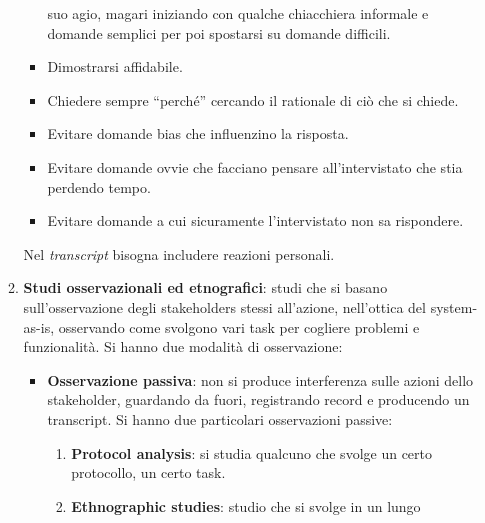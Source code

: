 \begin{itemize}
\begin{enumerate}
\begin{itemize}
                                    suo agio, magari iniziando con qualche
                                    chiacchiera informale e domande semplici per
                                    poi spostarsi su domande difficili.
                              \item Dimostrarsi affidabile.
                              \item Chiedere sempre “perché” cercando il rationale
                                    di ciò che si chiede.
                              \item Evitare domande bias che influenzino la risposta.
                              \item Evitare domande ovvie che facciano pensare
                                    all'intervistato che stia perdendo tempo.
                              \item Evitare domande a cui sicuramente l'intervistato
                                    non sa rispondere.
                        \end{itemize}
                        Nel \textit{transcript} bisogna includere reazioni personali.
                  \item \textbf{Studi osservazionali ed etnografici}: studi che
                        si basano sull'osservazione degli stakeholders stessi
                        all'azione, nell'ottica del system-as-is, osservando come
                        svolgono vari task per cogliere problemi e funzionalità.
                        Si hanno due modalità di osservazione:
                        \begin{itemize}
                              \item \textbf{Osservazione passiva}: non si produce
                                    interferenza sulle azioni dello stakeholder,
                                    guardando da fuori, registrando record e
                                    producendo un transcript. Si hanno due particolari
                                    osservazioni passive:
                                    \begin{enumerate}
                                          \item \textbf{Protocol analysis}: si
                                                studia qualcuno che svolge un
                                                certo protocollo, un certo task.
                                          \item \textbf{Ethnographic studies}:
                                                studio che si svolge in un lungo

\end{enumerate}
\end{itemize}
\end{enumerate}
\end{itemize}
